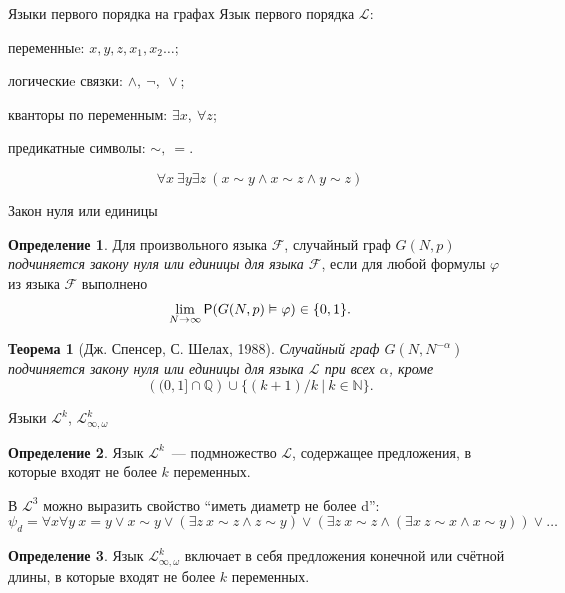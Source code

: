 \documentclass[aspectratio=169,hyperref={unicode},notheorems]{beamer}
\newtheorem {theorem}{Теорема}
\theoremstyle{definition}
\newtheorem {definition}{Определение}
\def \LL     {\mathcal{L}}
\def \N    {\mathbb {N}}
\def \F   {\mathcal{F}}
\def \Q    {\mathbb {Q}}
\def \P {{\sf P}}
\begin{document}
\begin{frame}{Языки первого порядка на графах}
\vspace{0.5 cm}
Язык первого порядка $\LL$:

переменныe: $x,y,z,x_1,x_2\ldots$; 

логическиe связки: $\wedge, ~\neg, ~\vee$; 

кванторы по переменным: $\exists x, ~\forall z$;

предикатные символы: $\sim, ~ =$.

\[ \forall x~ \exists y \exists z~ (x\sim y \wedge x\sim z \wedge y \sim z) \]

\end{frame}

\begin{frame}{Закон нуля или единицы}
\vspace{0.5 cm}
\begin{definition}
    Для произвольного языка $\F$, случайный граф $G(N, p)$ \textit{подчиняется закону нуля или единицы для языка $\F$},
    если для любой формулы $\varphi$ из языка 
    $\F$  выполнено
\[\lim_{N \rightarrow \infty} \P(G(N, p) \vDash \varphi) \in \{0, 1\}.\]
\end{definition}
\begin{theorem} [Дж. Спенсер, С. Шелах, 1988]
Случайный граф $G(N, N^{-\alpha})$ подчиняется закону нуля или единицы для языка $\LL$ при всех $\alpha$, кроме 
\[\left((0,1] \cap \Q \right) \cup \{(k+1)/k ~|~ k \in \N \}.\]
\end{theorem}
\end{frame}
\begin{frame}{Языки $\LL^k$, $\LL^k_{\infty, \omega}$}
\begin{definition}
    Язык $\LL^k$~--- подмножество $\LL$, содержащее предложения, в которые входят не более $k$ переменных.
\end{definition}
В $\LL^3$ можно выразить свойство ``иметь диаметр не более d'':
\[
\psi_d = \forall x \forall y ~ x = y \vee x \sim y \vee \left( \exists z ~ x\sim z \wedge z \sim y \right)
\vee  \left( \exists z ~ x\sim z \wedge \left( \exists x ~ z \sim x \wedge x \sim y \right) \right) \vee \ldots
\]
\begin{definition}
    Язык $\LL^k_{\infty, \omega}$ включает в себя предложения конечной или счётной длины, в которые входят не более $k$ переменных.
\end{definition}
\end{frame}
\end{document}
